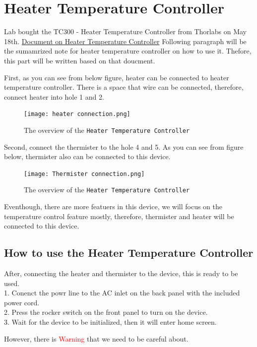 \documentclass{article}
\begin{document}
\section{Heater Temperature Controller}
Lab bought the TC300 - Heater Temperature Controller from Thorlabs on May 18th.
\href{https://www.thorlabs.com/drawings/1a9e0ae31580f35c-5554A647-C109-6112-A4FC47A27614B988/TC300-Manual.pdf}{Document on Heater Temperature Controller}
Following paragraph will be the sumamrized note for heater temperature controller on how to use it. 
Thefore, this part will be written based on that doucment.

First, as you can see from below figure, heater can be connected to heater temperature controller.
There is a space that wire can be connected, therefore, connect heater into hole 1 and 2.
\begin{figure}[htpb]
    \centering
    \texttt{[image: heater connection.png]}
    \caption{The overview of the \texttt{Heater Temperature Controller}}
    \label{fig:s_r}
\end{figure}

Second, connect the thermister to the hole 4 and 5. As you can see from figure below, thermister also can be connected to this device. 
\begin{figure}[htpb]
    \centering
    \texttt{[image: Thermister connection.png]}
    \caption{The overview of the \texttt{Heater Temperature Controller}}
    \label{fig:s_r}
\end{figure}

Eventhough, there are more featuers in this device, we will focus on the temperature control feature mostly,
therefore, thermister and heater will be connected to this device. 

\subsection{How to use the Heater Temperature Controller}
After, connecting the heater and thermister to the device, this is ready to be used. \\

1. Conenct the powr line to the AC inlet on the back panel with the included power cord. \\
2. Press the rocker switch on the front panel to turn on the device. \\
3. Wait for the device to be initialized, then it will enter home screen.

However, there is \textcolor{red}{Warning} that we need to be careful about.
\end{document}
